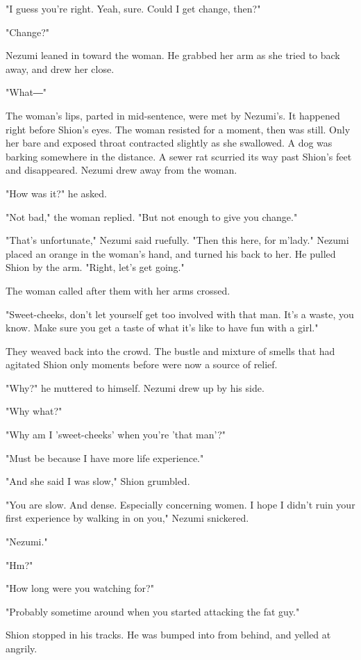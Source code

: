 "I guess you're right. Yeah, sure. Could I get change, then?"

"Change?"

Nezumi leaned in toward the woman. He grabbed her arm as she tried to
back away, and drew her close.

"What―"

The woman's lips, parted in mid-sentence, were met by Nezumi's. It
happened right before Shion's eyes. The woman resisted for a moment,
then was still. Only her bare and exposed throat contracted slightly as
she swallowed. A dog was barking somewhere in the distance. A sewer rat
scurried its way past Shion's feet and disappeared. Nezumi drew away
from the woman.

"How was it?" he asked.

"Not bad," the woman replied. "But not enough to give you change."

"That's unfortunate," Nezumi said ruefully. "Then this here, for
m'lady." Nezumi placed an orange in the woman's hand, and turned his
back to her. He pulled Shion by the arm. "Right, let's get going."

The woman called after them with her arms crossed.

"Sweet-cheeks, don't let yourself get too involved with that man. It's a
waste, you know. Make sure you get a taste of what it's like to have fun
with a girl."

They weaved back into the crowd. The bustle and mixture of smells that
had agitated Shion only moments before were now a source of relief.

"Why?" he muttered to himself. Nezumi drew up by his side.

"Why what?"

"Why am I 'sweet-cheeks' when you're 'that man'?"

"Must be because I have more life experience."

"And she said I was slow," Shion grumbled.

"You are slow. And dense. Especially concerning women. I hope I didn't
ruin your first experience by walking in on you," Nezumi snickered.

"Nezumi."

"Hm?"

"How long were you watching for?"

"Probably sometime around when you started attacking the fat guy."

Shion stopped in his tracks. He was bumped into from behind, and yelled
at angrily.

